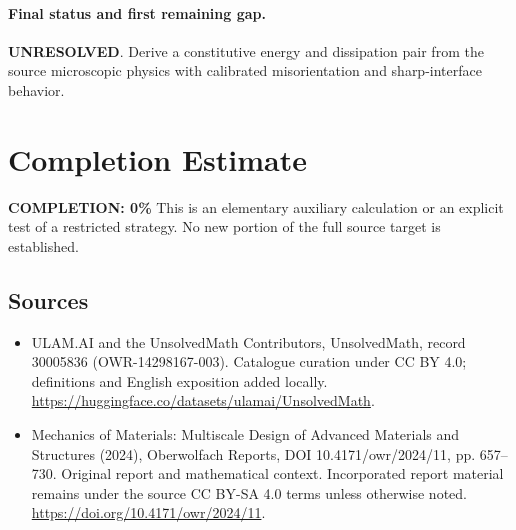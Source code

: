 \documentclass[11pt]{article}
\begin{document}
\paragraph{Final status and first remaining gap.}
\textbf{UNRESOLVED}. Derive a constitutive energy and dissipation pair from the source microscopic physics with calibrated misorientation and sharp-interface behavior.

\section{Completion Estimate}
\noindent\textbf{COMPLETION: 0\%}
This is an elementary auxiliary calculation or an explicit test of a restricted strategy. No new portion of the full source target is established.

\subsection{Sources}
\begin{itemize}
\item[\hypertarget{source:30005836:1}{S1}] ULAM.AI and the UnsolvedMath Contributors, UnsolvedMath, record 30005836 (OWR-14298167-003). Catalogue curation under CC BY 4.0; definitions and English exposition added locally.
\url{https://huggingface.co/datasets/ulamai/UnsolvedMath}.
\item[\hypertarget{source:30005836:2}{S2}] Mechanics of Materials: Multiscale Design of Advanced Materials and Structures (2024), Oberwolfach Reports, DOI 10.4171/owr/2024/11, pp. 657--730. Original report and mathematical context. Incorporated report material remains under the source CC BY-SA 4.0 terms unless otherwise noted.
\url{https://doi.org/10.4171/owr/2024/11}.
\end{itemize}
\label{end:30005836}
\end{document}
